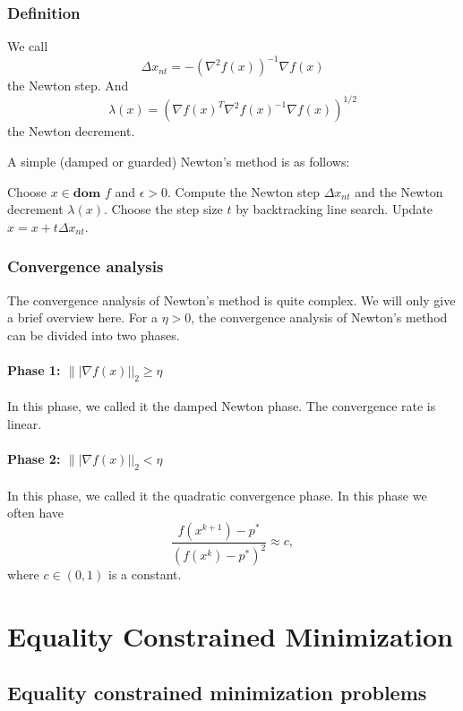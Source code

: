 \documentclass[lang=en,color=blue,mode=fancy,titlestyle=hang]{elegantbook}
\begin{document}
\subsection{Definition}
We call
\[
\Delta x_{nt} = -(\nabla^2 f(x))^{-1} \nabla f(x)
\]
the Newton step. And
\[
\lambda(x) = (\nabla f(x)^T \nabla^2 f(x)^{-1} \nabla f(x))^{1/2}
\]
the Newton decrement.

A simple (damped or guarded) Newton's method is as follows:
\begin{algorithm}[H]
\caption{Newton's method}
\begin{algorithmic}[1]
\State Choose $x \in \textbf{dom } f$ and $\epsilon > 0$.
\State Compute the Newton step $\Delta x_{nt}$ and the Newton decrement $\lambda(x)$.
\State Choose the step size $t$ by backtracking line search.
\State Update $x = x + t \Delta x_{nt}$.
\EndWhile
\end{algorithmic}
\end{algorithm}

\subsection{Convergence analysis}
The convergence analysis of Newton's method is quite complex. We will only give a brief overview here.
For a $\eta > 0$, the convergence analysis of Newton's method can be divided into two phases.

\subsubsection{Phase 1: $\||\nabla f(x)||_2 \geq \eta$} In this phase, we called it the damped Newton phase.
The convergence rate is linear.

\subsubsection{Phase 2: $\||\nabla f(x)||_2 < \eta$} In this phase, we called it the quadratic
convergence phase. In this phase we often have
\[
\frac{f(x^{k+1}) - p^*}{{(f(x^k) - p^*)}^2} \approx c,
\]
where $c \in (0, 1)$ is a constant.

\newpage
\chapter{Equality Constrained Minimization}
\section{Equality constrained minimization problems}
\end{document}
